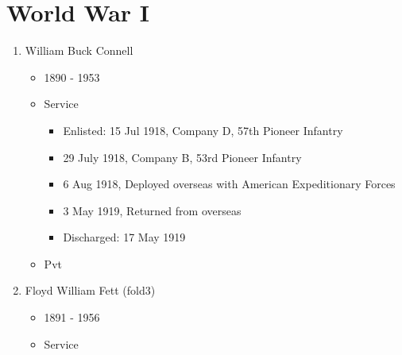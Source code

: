 \documentclass[11pt,letter]{book}
\begin{document}

\chapter{World War I}

\begin{enumerate}

\item William Buck Connell
\begin{itemize}
\item 1890 - 1953
\item Service
\begin{itemize}
\item Enlisted: 15 Jul 1918, Company D, 57th Pioneer Infantry
\item 29 July 1918, Company B, 53rd Pioneer Infantry
\item 6 Aug 1918, Deployed overseas with American Expeditionary Forces
\item 3 May 1919, Returned from overseas
\item Discharged:  17 May 1919
\end{itemize}
\item Pvt
\end{itemize}

\item Floyd William Fett (fold3)
\begin{itemize}
\item 1891 - 1956
\item Service
\end{itemize}


\end{enumerate}
\end{document}
